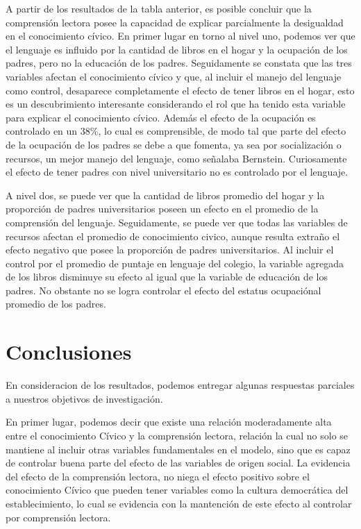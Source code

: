 \documentclass[12pt,twoside]{templates/facsothesis}
\begin{document}
A partir de los resultados de la tabla anterior, es posible concluir que la comprensión lectora posee la capacidad de explicar parcialmente la desigualdad en el conocimiento cívico. En primer lugar en torno al nivel uno, podemos ver que el lenguaje es influido por la cantidad de libros en el hogar y la ocupación de los padres, pero no la educación de los padres. Seguidamente se constata que las tres variables afectan el conocimiento cívico y que, al incluir el manejo del lenguaje como control, desaparece completamente el efecto de tener libros en el hogar, esto es un descubrimiento interesante considerando el rol que ha tenido esta variable para explicar el conocimiento cívico. Además el efecto de la ocupación es controlado en un 38\%, lo cual es comprensible, de modo tal que parte del efecto de la ocupación de los padres se debe a que fomenta, ya sea por socialización o recursos, un mejor manejo del lenguaje, como señalaba Bernstein. Curiosamente el efecto de tener padres con nivel universitario no es controlado por el lenguaje.

A nivel dos, se puede ver que la cantidad de libros promedio del hogar y la proporción de padres universitarios poseen un efecto en el promedio de la comprensión del lenguaje. Seguidamente, se puede ver que todas las variables de recursos afectan el promedio de conocimiento civico, aunque resulta extraño el efecto negativo que posee la proporción de padres universitarios. Al incluir el control por el promedio de puntaje en lenguaje del colegio, la variable agregada de los libros disminuye su efecto al igual que la variable de educación de los padres. No obstante no se logra controlar el efecto del estatus ocupaciónal promedio de los padres.

\hypertarget{conclusiones}{%
\chapter{Conclusiones}\label{conclusiones}}

En consideracion de los resultados, podemos entregar algunas respuestas parciales a nuestros objetivos de investigación.

En primer lugar, podemos decir que existe una relación moderadamente alta entre el conocimiento Cívico y la comprensión lectora, relación la cual no solo se mantiene al incluir otras variables fundamentales en el modelo, sino que es capaz de controlar buena parte del efecto de las variables de origen social. La evidencia del efecto de la comprensión lectora, no niega el efecto positivo sobre el conocimiento Cívico que pueden tener variables como la cultura democrática del establecimiento, lo cual se evidencia con la mantención de este efecto al controlar por comprensión lectora.
\end{document}
